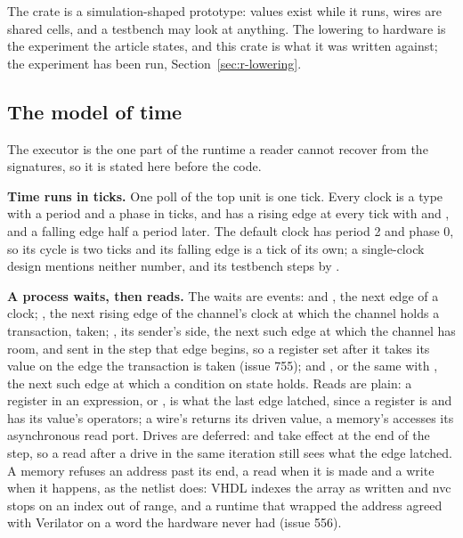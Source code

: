 The crate is a simulation-shaped prototype: values exist while it
runs, wires are shared cells, and a testbench may look at anything.
The lowering to hardware is the experiment the article states, and
this crate is what it was written against; the experiment has been
run, Section~\ref{sec:r-lowering}.

\subsection{The model of time}
\label{sec:r-time}

The executor is the one part of the runtime a reader cannot recover
from the signatures, so it is stated here before the code.

\textbf{Time runs in ticks.} One poll of the top unit is one tick.
Every clock is a type with a period and a phase in ticks, and has a
rising edge at every tick  with  and
, and a falling edge half a period
later. The default clock has period 2 and phase 0, so its cycle is two
ticks and its falling edge is a tick of its own; a single-clock design
mentions neither number, and its testbench steps by
.

\textbf{A process waits, then reads.} The waits are events:
 and , the next edge of a clock;
, the next rising edge of the channel's clock at which
the channel holds a transaction, taken; , its
sender's side, the next such edge at which the channel has room, and
 sent in the step that edge begins, so a register set after it
takes its value on the edge the transaction is taken (issue 755); and
,
or the same with , the next such edge at which a
condition on state holds. Reads are plain: a register in an
expression, or , is what the last edge latched, since
a register is  and has its value's operators; a wire's
 returns its driven value, a memory's  accesses
its asynchronous read port. Drives are
deferred:  and  take effect at the end
of the step, so a read after a drive in the same iteration still sees
what the edge latched. A memory refuses an address past its end, a
read when it is made and a write when it happens, as the netlist does:
VHDL indexes the array as written and nvc stops on an index out of
range, and a runtime that wrapped the address agreed with Verilator on
a word the hardware never had (issue 556).

